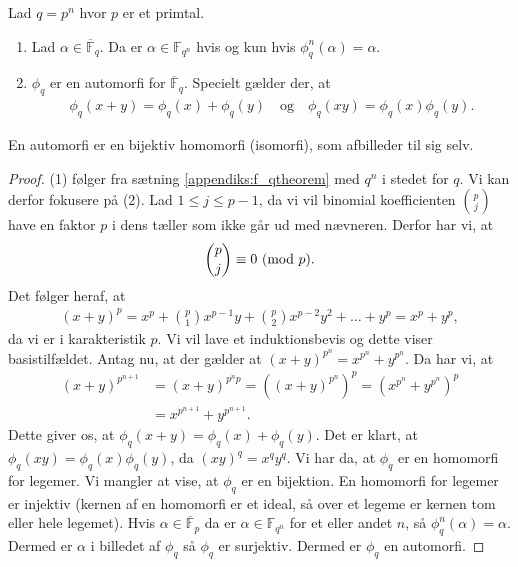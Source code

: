 \begin{proposition}
Lad $q=p^n$ hvor $p$ er et primtal.
\begin{enumerate}
	\item Lad $\alpha \in \overline{\mathbb{F}}_q$. Da er $\alpha \in \mathbb{F}_{q^n}$ 
	hvis og kun hvis $\phi_{q}^{n}(\alpha) = \alpha$.
	\item $\phi_q$ er en automorfi for $\overline{\mathbb{F}}_q$. Specielt gælder der,
	at 
	\begin{align*}
		\phi_q (x+y) = \phi_q(x) + \phi_q(y) \quad \text{og} \quad \phi_q(xy) =
		 \phi_q(x)\phi_q(y).
	\end{align*}
\end{enumerate}
\end{proposition}
En automorfi er en bijektiv homomorfi (isomorfi), som afbilleder til sig selv.
\begin{proof}
(1) følger fra sætning \ref{appendiks:f_qtheorem} med $q^n$ i stedet for $q$. Vi kan derfor fokusere på (2). Lad $1 \leq j \leq p-1$, da vi vil binomial koefficienten 
$\binom{p}{j}$ have en faktor $p$ i dens tæller som ikke går ud med nævneren. Derfor har vi, at 
\begin{align*}
	\binom{p}{j} \equiv 0 \ (\mathrm{mod} \ p).
\end{align*}
Det følger heraf, at 
\begin{align*}
	(x + y)^p = x^p + \binom{p}{1}x^{p-1}y + \binom{p}{2}x^{p-2}y^2 + 
	\ldots + y^p = x^p + y^p,
\end{align*}
da vi er i karakteristik $p$. Vi vil lave et induktionsbevis og dette viser basistilfældet. Antag nu, at der gælder at $(x+y)^{p^n} = x^{p^n} + y^{p^n}$. Da har vi, at
\begin{align*}
	(x+y)^{p^{n+1}} &= (x+y)^{p^n p} = ((x+y)^{p^n})^p
	= (x^{p^n} + y^{p^n})^p \\
	&= x^{p^{n+1}} + y^{p^{n+1}}.
\end{align*}
Dette giver os, at $\phi_q(x+y) = \phi_q(x) + \phi_q(y)$. Det er klart, at 
$\phi_q(xy)=\phi_q(x) \phi_q(y)$, da $(xy)^q = x^q y^q$. Vi har da, at $\phi_q$ er en homomorfi for legemer. Vi mangler at vise, at $\phi_q$ er en bijektion. En homomorfi for legemer er injektiv (kernen af en homomorfi er et ideal, så over et legeme er kernen tom eller hele legemet). Hvis $\alpha \in \overline{\mathbb{F}}_p$ da er 
$\alpha \in \mathbb{F}_{q^n}$ for et eller andet $n$, så $\phi_{q}^{n}(\alpha) = \alpha$. Dermed er $\alpha$ i billedet af $\phi_q$ så $\phi_q$ er surjektiv. Dermed er $\phi_q$ en automorfi.
\end{proof}

